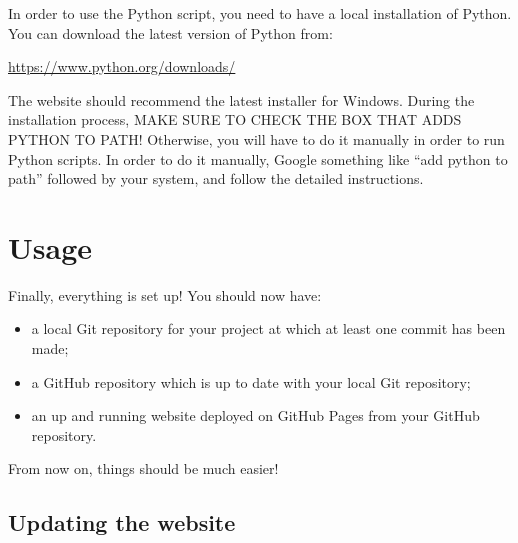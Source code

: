 \documentclass[a4paper,10pt]{article}
\begin{document}
In order to use the Python script, you need to have a local installation of Python. You can download the latest version of Python from:

\url{https://www.python.org/downloads/}

The website should recommend the latest installer for Windows. During the installation process, MAKE SURE TO CHECK THE BOX THAT ADDS PYTHON TO PATH! Otherwise, you will have to do it manually in order to run Python scripts. In order to do it manually, Google something like ``add python to path'' followed by your system, and follow the detailed instructions.

\clearpage
\section{Usage}

Finally, everything is set up! You should now have:
\begin{itemize}
    \item a local Git repository for your project at which at least one commit has been made;
    \item a GitHub repository which is up to date with your local Git repository;
    \item an up and running website deployed on GitHub Pages from your GitHub repository.
\end{itemize}
From now on, things should be much easier! 

\subsection{Updating the website}
\end{document}
